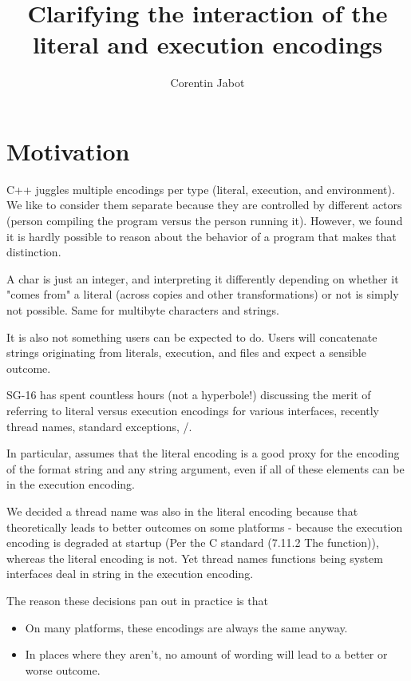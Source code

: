 \documentclass{wg21}
\title{Clarifying the interaction of the literal and execution encodings}
\author{Corentin Jabot}{corentin.jabot@gmail.com}
\begin{document}
\maketitle

\section{Motivation}

C++ juggles multiple encodings per type (literal, execution, and environment).
We like to consider them separate because they are controlled by different actors (person compiling the program versus
the person running it). However, we found it is hardly possible to reason about the behavior of a program that makes
that distinction.

A char is just an integer, and interpreting it differently depending on whether it "comes from" a literal (across copies and other transformations) or not is simply not possible. Same for multibyte characters and strings.

It is also not something users can be expected to do. Users will concatenate strings originating from literals, execution, and files
and expect a sensible outcome.

SG-16 has spent countless hours (not a hyperbole!) discussing the merit of referring to literal versus execution encodings for various interfaces,
recently thread names, standard exceptions, /.

In particular,  assumes that the literal encoding is a good proxy for the encoding of the format string and
any string argument, even if all of these elements can be in the execution encoding.

We decided a thread name was also in the literal encoding because that theoretically leads to better outcomes on some platforms - because
the execution encoding is degraded at startup (Per the C standard (7.11.2 The  function)), whereas the literal encoding is not.
Yet thread names functions being system interfaces deal in string in the execution encoding.

The reason these decisions pan out in practice is that
\begin{itemize}
\item On many platforms, these encodings are always the same anyway.
\item In places where they aren't, no amount of wording will lead to a better or worse outcome.
\end{itemize}
\end{document}
